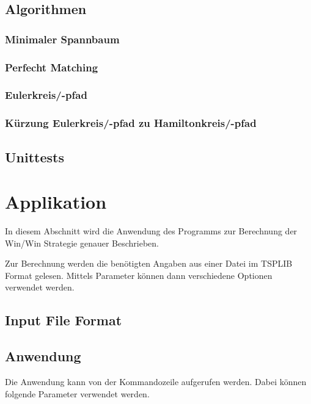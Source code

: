 \documentclass[11pt,a4paper]{article}
\begin{document}
\subsection{Algorithmen}
\subsubsection{Minimaler Spannbaum}
\subsubsection{Perfecht Matching}
\subsubsection{Eulerkreis/-pfad}
\subsubsection{Kürzung Eulerkreis/-pfad zu Hamiltonkreis/-pfad}
\subsection{Unittests}

\newpage

\section{Applikation}
In diesem Abschnitt wird die Anwendung des Programms zur Berechnung der Win/Win Strategie genauer Beschrieben.

Zur Berechnung werden die benötigten Angaben aus einer Datei im TSPLIB Format gelesen. Mittels Parameter können dann verschiedene Optionen verwendet werden.

\subsection{Input File Format}
\subsection{Anwendung}
Die Anwendung kann von der Kommandozeile aufgerufen werden. Dabei können folgende Parameter verwendet werden.
\end{document}
